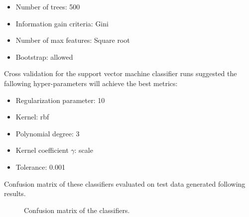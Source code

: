 \begin{itemize}
    \item Number of trees: 500
    \item Information gain criteria: Gini
    \item Number of max features: Square root
    \item Bootstrap: allowed
\end{itemize}

Cross validation for the support vector machine classifier runs suggested the fallowing hyper-parameters will achieve the best metrics:

\begin{itemize}
    \item Regularization parameter: 10
    \item Kernel: rbf
    \item Polynomial degree: 3
    \item Kernel coefficient $\gamma$: scale
    \item Tolerance: 0.001
\end{itemize}

Confusion matrix of these classifiers evaluated on test data generated following results.

\begin{figure}[H]%
    \centering
    \qquad
    \caption{Confusion matrix of the classifiers.}%
    \label{fig:cmatrix}%
\end{figure}

